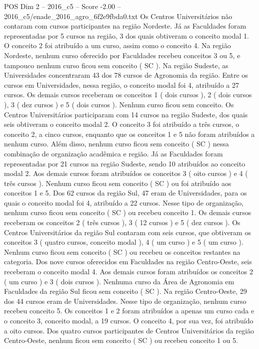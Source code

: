 \begin{textsample}{POS Dim 2 – 2016\_c5 – Score -2.00 – 2016\_c5/enade\_2016\_agro\_6f2e9fbda0.txt}
Os Centros Universitários não contaram com cursos participantes na região Nordeste.
Já as Faculdades foram representadas por 5 cursos na região, 3 dos quais obtiveram o conceito modal 1.
O conceito 2 foi atribuído a um curso, assim como o conceito 4.
Na região Nordeste, nenhum curso oferecido por Faculdades recebeu conceitos 3 ou 5, e tampouco nenhum curso ficou sem conceito ( SC ).
Na região Sudeste, as Universidades concentraram 43 dos 78 cursos de Agronomia da região.
Entre os cursos em Universidades, nessa região, o conceito modal foi 4, atribuído a 27 cursos.
Os demais cursos receberam os conceitos 1 ( dois cursos ), 2 ( dois cursos ), 3 ( dez cursos ) e 5 ( dois cursos ).
Nenhum curso ficou sem conceito.
Os Centros Universitários participaram com 14 cursos na região Sudeste, dos quais seis obtiveram o conceito modal 2.
O conceito 3 foi atribuído a três cursos, o conceito 2, a cinco cursos, enquanto que os conceitos 1 e 5 não foram atribuídos a nenhum curso.
Além disso, nenhum curso ficou sem conceito ( SC ) nessa combinação de organização acadêmica e região.
Já as Faculdades foram representadas por 21 cursos na região Sudeste, sendo 10 atribuídos ao conceito modal 2.
Aos demais cursos foram atribuídos os conceitos 3 ( oito cursos ) e 4 ( três cursos ).
Nenhum curso ficou sem conceito ( SC ) ou foi atribuído aos conceitos 1 e 5.
Dos 62 cursos da região Sul, 47 eram de Universidades, para os quais o conceito modal foi 4, atribuído a 22 cursos.
Nesse tipo de organização, nenhum curso ficou sem conceito ( SC ) ou recebeu conceito 1.
Os demais cursos receberam os conceitos 2 ( três cursos ), 3 ( 12 cursos ) e 5 ( dez cursos ).
Os Centros Universitários da região Sul contaram com seis cursos, que obtiveram os conceitos 3 ( quatro cursos, conceito modal ), 4 ( um curso ) e 5 ( um curso ).
Nenhum curso ficou sem conceito ( SC ) ou recebeu os conceitos restantes na categoria.
Dos nove cursos oferecidos em Faculdades na região Centro-Oeste, seis receberam o conceito modal 4.
Aos demais cursos foram atribuídos os conceitos 2 ( um curso ) e 3 ( dois cursos ).
Nenhuma curso da Área de Agronomia em Faculdades da região Sul ficou sem conceito ( SC ).
Na região Centro-Oeste, 29 dos 44 cursos eram de Universidades.
Nesse tipo de organização, nenhum curso recebeu conceito 5.
Os conceitos 1 e 2 foram atribuídos a apenas um curso cada e o conceito 3, conceito modal, a 19 cursos.
O conceito 4, por sua vez, foi atribuído a oito cursos.
Dos quatro cursos participantes de Centros Universitários da região Centro-Oeste, nenhum ficou sem conceito ( SC ) ou recebeu conceito 1 ou 5.

\end{textsample}
